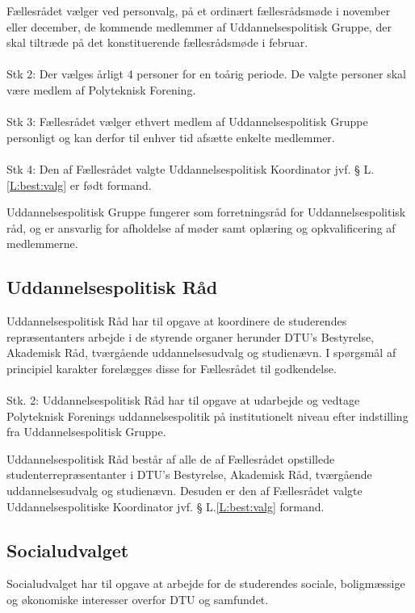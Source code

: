\begin{list}
\item Fællesrådet vælger ved personvalg, på et ordinært fællesrådsmøde i november eller december, de kommende medlemmer af Uddannelsespolitisk Gruppe, der skal tiltræde på det konstituerende fællesrådsmøde i februar.
\\
\\
Stk 2: Der vælges årligt 4 personer for en toårig periode. De valgte personer skal være medlem af Polyteknisk Forening.
\\
\\
Stk 3: Fællesrådet vælger ethvert medlem af Uddannelsespolitisk Gruppe personligt og kan derfor til enhver tid afsætte enkelte medlemmer.
\\
\\
Stk 4: Den af Fællesrådet valgte Uddannelsespolitisk Koordinator jvf. § L.\ref{L:best:valg} er født formand.

\item Uddannelsespolitisk Gruppe fungerer som forretningsråd for Uddannelsespolitisk råd, og er ansvarlig for afholdelse af møder samt oplæring og opkvalificering af medlemmerne.



\subsection{Uddannelsespolitisk Råd}
\item Uddannelsespolitisk Råd har til opgave at koordinere de studerendes repræsentanters arbejde i de styrende organer herunder DTU’s Bestyrelse, Akademisk Råd, tværgående uddannelsesudvalg og studienævn. I spørgsmål af principiel karakter forelægges disse for Fællesrådet til godkendelse.
\\
\\
Stk. 2: Uddannelsespolitisk Råd har til opgave at udarbejde og vedtage Polyteknisk Forenings
uddannelsespolitik på institutionelt niveau efter indstilling fra Uddannelsespolitisk Gruppe.

\item
Uddannelsespolitisk Råd består af alle de af Fællesrådet opstillede studenterrepræsentanter i DTU’s
Bestyrelse, Akademisk Råd, tværgående uddannelsesudvalg og studienævn. Desuden er den af Fællesrådet
valgte Uddannelsespolitiske Koordinator jvf. § L.\ref{L:best:valg} formand.


\subsection{Socialudvalget}
\item Socialudvalget har til opgave at arbejde for de studerendes sociale, boligmæssige og økonomiske interesser overfor DTU og samfundet.


\end{list}
